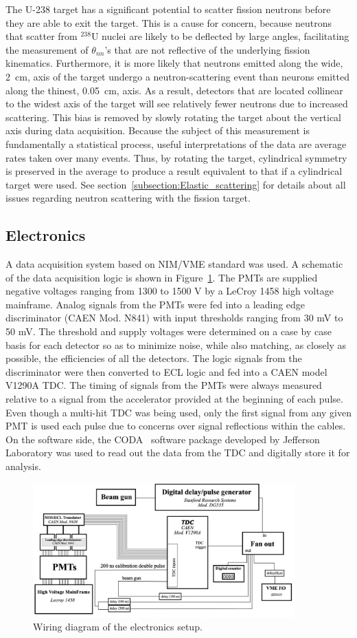 The U-238 target has a significant potential to scatter fission neutrons before they are able to exit the target.
This is a cause for concern, because neutrons that scatter from $^{238}$U nuclei are likely to be deflected by large angles, facilitating the measurement of $\theta_{nn}$'s that are not reflective of the underlying fission kinematics. 
Furthermore, it is more likely that neutrons emitted along the wide, 2~cm, axis of the target undergo a neutron-scattering event than neurons emitted along the thinest, 0.05~cm, axis.
As a result, detectors that are located collinear to the widest axis of the target will see relatively fewer neutrons due to increased scattering. 
This bias is removed by slowly rotating the target about the vertical axis during data acquisition.
Because the subject of this measurement is fundamentally a statistical process, useful interpretations of the data are average rates taken over many events.
Thus, by rotating the target, cylindrical symmetry is preserved in the average to produce a result equivalent to that if a cylindrical target were used.
See section~\ref{subsection:Elastic_scattering} for details about all issues regarding neutron scattering with the fission target.  

\subsection{Electronics}
A data acquisition system based on NIM/VME standard was used.
A schematic of the data acquisition logic is shown in Figure~\ref{fig:WiringDiagram}.
The PMTs are supplied negative voltages ranging from 1300 to 1500 V by a LeCroy 1458 high voltage mainframe.
Analog signals from the PMTs were fed into a leading edge discriminator (CAEN Mod. N841) with input thresholds ranging from 30 mV to 50 mV.
The threshold and supply voltages were determined on a case by case basis for each detector so as to minimize noise, while also matching, as closely as possible, the efficiencies of all the detectors.
The logic signals from the discriminator were then converted to ECL logic and fed into a CAEN model V1290A TDC.
The timing of signals from the PMTs were always measured relative to a signal from the accelerator provided at the beginning of each pulse.
Even though a multi-hit TDC was being used, only the first signal from any given PMT is used each pulse due to concerns over signal reflections within the cables.
On the software side, the CODA~\cite{CODA} software package developed by Jefferson Laboratory was used to read out the data from the TDC and digitally store it for analysis.

\begin{figure}[h]
\includegraphics[width=0.9\textwidth]{Content/Methods/WiringDiagram.png}
\caption{Wiring diagram of the electronics setup. }
\label{fig:WiringDiagram}
\end{figure}
